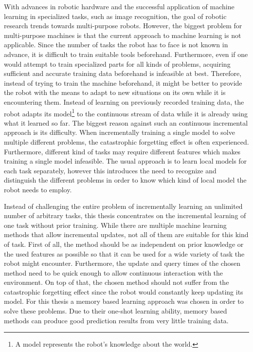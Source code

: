 With advances in robotic hardware and the successful application of machine learning in specialized tasks, such as image recognition, the goal of robotic research trends towards multi-purpose robots. However, the biggest problem for multi-purpose machines is that the current approach to machine learning is not applicable. Since the number of tasks the robot has to face is not known in advance, it is difficult to train suitable tools beforehand. Furthermore, even if one would attempt to train specialized parts for all kinds of problems, acquiring sufficient and accurate training data beforehand is infeasible at best. 
Therefore, instead of trying to train the machine beforehand, it might be better to provide the robot with the means to adapt to new situations on its own while it is encountering them. 
Instead of learning on previously recorded training data, the robot adapts its model\footnote{A model represents the robot's knowledge about the world.} to the continuous stream of data while it is already using what it learned so far. 
The biggest reason against such an continuous incremental approach is its difficulty. When incrementally training a single model to solve multiple different problems, the catastrophic forgetting effect is often experienced. Furthermore, different kind of tasks may require different features which makes training a single model infeasible. The usual approach is to learn local models for each task separately, however this introduces the need to recognize and distinguish the different problems in order to know which kind of local model the robot needs to employ.

Instead of challenging the entire problem of incrementally learning an unlimited number of arbitrary tasks, this thesis concentrates on the incremental learning of one task without prior training. 
While there are multiple machine learning methods that allow incremental updates, not all of them are suitable for this kind of task. 
First of all, the method should be as independent on prior knowledge or the used features as possible so that it can be used for a wide variety of task the robot might encounter. Furthermore, the update and query times of the chosen method need to be quick enough to allow continuous interaction with the environment. On top of that, the chosen method should not suffer from the catastrophic forgetting effect since the robot would constantly keep updating its model. For this thesis a memory based learning approach was chosen in order to solve these problems. Due to their one-shot learning ability, memory based methods can produce good prediction results from very little training data. 

